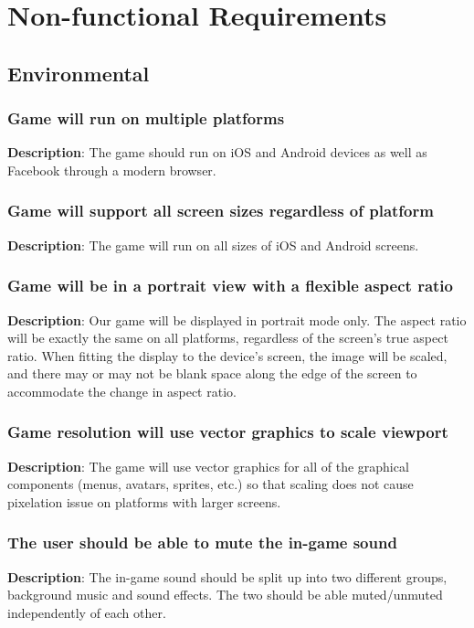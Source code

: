 \chapter{Non-functional Requirements}

\section{Environmental}
\renewcommand\thesubsection{ENV-%
\ifnum\value{subsection}<10 0\fi
\arabic{subsection}}
\subsection{Game will run on multiple platforms}
\textbf{Description}: The game should run on iOS and Android devices as well
as Facebook through a modern browser.

\subsection{Game will support all screen sizes regardless of platform}
\textbf{Description}: The game will run on all sizes of iOS and Android screens.

\subsection{Game will be in a portrait view with a flexible aspect ratio}
\textbf{Description}: Our game will be displayed in portrait mode only. The
aspect ratio will be exactly the same on all platforms, regardless
of the screen\textquoteright{}s true aspect ratio. When fitting the
display to the device\textquoteright{}s screen, the image will be
scaled, and there may or may not be blank space along the edge of
the screen to accommodate the change in aspect ratio.

\subsection{Game resolution will use vector graphics to scale viewport}
\textbf{Description}: The game will use vector graphics for all of
the graphical components (menus, avatars, sprites, etc.) so that scaling
does not cause pixelation issue on platforms with larger screens. 

\subsection{The user should be able to mute the in-game sound }
\textbf{Description}: The in-game sound should be split up into two different
groups, background music and sound effects. The two should be able
muted/unmuted independently of each other.

